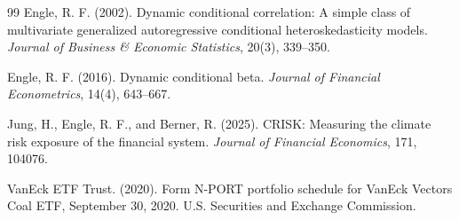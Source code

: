 \documentclass[11pt]{article}
\begin{document}
\begin{thebibliography}{99}
Engle, R. F. (2002). Dynamic conditional correlation: A simple class of multivariate generalized autoregressive conditional heteroskedasticity models. \textit{Journal of Business \& Economic Statistics}, 20(3), 339--350.

Engle, R. F. (2016). Dynamic conditional beta. \textit{Journal of Financial Econometrics}, 14(4), 643--667.

Jung, H., Engle, R. F., and Berner, R. (2025). CRISK: Measuring the climate risk exposure of the financial system. \textit{Journal of Financial Economics}, 171, 104076.

VanEck ETF Trust. (2020). Form N-PORT portfolio schedule for VanEck Vectors Coal ETF, September 30, 2020. U.S. Securities and Exchange Commission.
\end{thebibliography}
\end{document}
